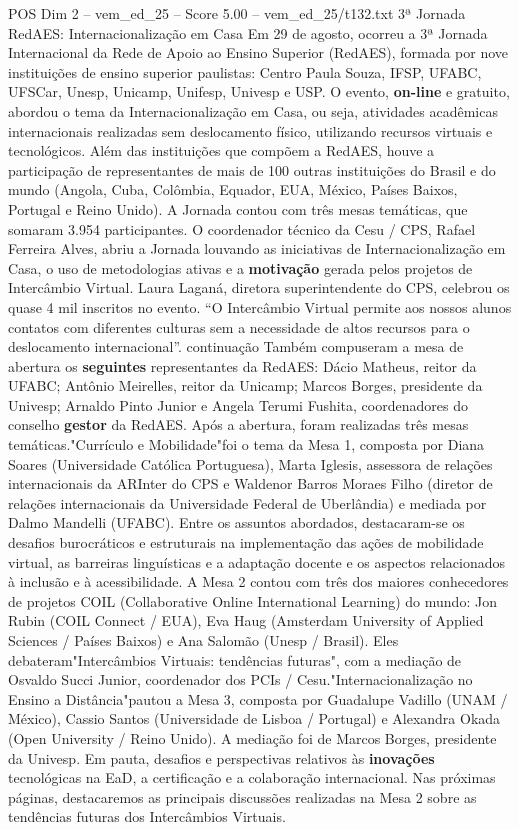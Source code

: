 \begin{textsample}{POS Dim 2 – vem\_ed\_25 – Score 5.00 – vem\_ed\_25/t132.txt}  \label{ex:f2_pos_135}
3ª Jornada RedAES: Internacionalização em Casa Em 29 de agosto, ocorreu a 3ª Jornada Internacional da Rede de Apoio ao Ensino Superior (RedAES), formada por nove instituições de ensino superior paulistas: Centro Paula Souza, IFSP, UFABC, UFSCar, Unesp, Unicamp, Unifesp, Univesp e USP.
O evento, \textbf{on-line} e gratuito, abordou o tema da Internacionalização em Casa, ou seja, atividades acadêmicas internacionais realizadas sem deslocamento físico, utilizando recursos virtuais e tecnológicos.
Além das instituições que compõem a RedAES, houve a participação de representantes de mais de 100 outras instituições do Brasil e do mundo (Angola, Cuba, Colômbia, Equador, EUA, México, Países Baixos, Portugal e Reino Unido).
A Jornada contou com três mesas temáticas, que somaram 3.954 participantes.
O coordenador técnico da Cesu / CPS, Rafael Ferreira Alves, abriu a Jornada louvando as iniciativas de Internacionalização em Casa, o uso de metodologias ativas e a \textbf{motivação} gerada pelos projetos de Intercâmbio Virtual.
Laura Laganá, diretora superintendente do CPS, celebrou os quase 4 mil inscritos no evento. “O Intercâmbio Virtual permite aos nossos alunos contatos com diferentes culturas sem a necessidade de altos recursos para o deslocamento internacional”. continuação Também compuseram a mesa de abertura os \textbf{seguintes} representantes da RedAES: Dácio Matheus, reitor da UFABC; Antônio Meirelles, reitor da Unicamp; Marcos Borges, presidente da Univesp; Arnaldo Pinto Junior e Angela Terumi Fushita, coordenadores do conselho \textbf{gestor} da RedAES.
Após a abertura, foram realizadas três mesas temáticas."Currículo e Mobilidade"foi o tema da Mesa 1, composta por Diana Soares (Universidade Católica Portuguesa), Marta Iglesis, assessora de relações internacionais da ARInter do CPS e Waldenor Barros Moraes Filho (diretor de relações internacionais da Universidade Federal de Uberlândia) e mediada por Dalmo Mandelli (UFABC).
Entre os assuntos abordados, destacaram-se os desafios burocráticos e estruturais na implementação das ações de mobilidade virtual, as barreiras linguísticas e a adaptação docente e os aspectos relacionados à inclusão e à acessibilidade.
A Mesa 2 contou com três dos maiores conhecedores de projetos COIL (Collaborative Online International Learning) do mundo: Jon Rubin (COIL Connect / EUA), Eva Haug (Amsterdam University of Applied Sciences / Países Baixos) e Ana Salomão (Unesp / Brasil).
Eles debateram"Intercâmbios Virtuais: tendências futuras", com a mediação de Osvaldo Succi Junior, coordenador dos PCIs / Cesu."Internacionalização no Ensino a Distância"pautou a Mesa 3, composta por Guadalupe Vadillo (UNAM / México), Cassio Santos (Universidade de Lisboa / Portugal) e Alexandra Okada (Open University / Reino Unido).
A mediação foi de Marcos Borges, presidente da Univesp.
Em pauta, desafios e perspectivas relativos às \textbf{inovações} tecnológicas na EaD, a certificação e a colaboração internacional.
Nas próximas páginas, destacaremos as principais discussões realizadas na Mesa 2 sobre as tendências futuras dos Intercâmbios Virtuais.

\end{textsample}
